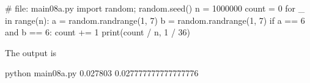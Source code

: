 \begin{console}[frame=single,fontsize=\footnotesize]
# file: main08a.py
import random; random.seed()
n = 1000000
count = 0
for _ in range(n):
    a = random.randrange(1, 7)
    b = random.randrange(1, 7)
    if a == 6 and b == 6:
        count += 1
print(count / n, 1 / 36)
\end{console}
The output is
\begin{console} python main08a.py
0.027803 0.027777777777777776
\end{console}

